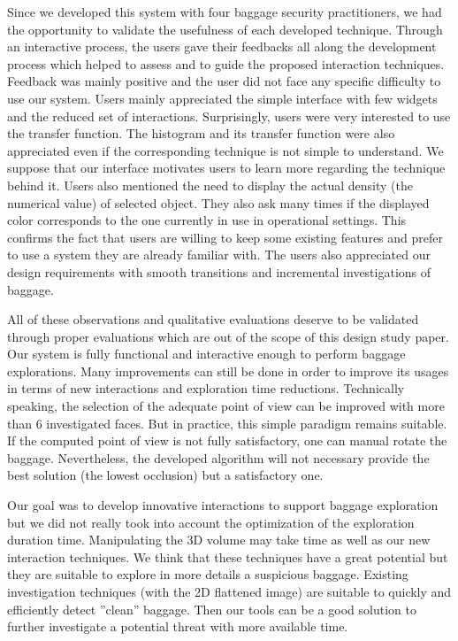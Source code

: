 Since we developed this system with four baggage security practitioners, we had the opportunity to validate the usefulness of each developed technique. Through an interactive process, the users gave their feedbacks all along the development process which helped to assess and to guide the proposed interaction techniques. Feedback was mainly positive and the user did not face any specific difficulty to use our system. Users mainly appreciated the simple interface with few widgets and the reduced set of interactions. Surprisingly, users were very interested to use the transfer function. The histogram and its transfer function were also appreciated even if the corresponding technique is not simple to understand. We suppose that our interface motivates users to learn more regarding the technique behind it. Users also mentioned the need to display the actual density (the numerical value) of selected object. They also ask many times if the displayed color corresponds to the one currently in use in operational settings. This confirms the fact that users are willing to keep some existing features and prefer to use a system they are already familiar with.
The users also appreciated our design requirements with smooth transitions and incremental investigations of baggage.
\par All of these observations and qualitative evaluations deserve to be validated through proper evaluations which are out of the scope of this design study paper.
Our system is fully functional and interactive enough to perform baggage explorations. Many improvements can still be done in order to improve its usages in terms of new interactions and exploration time reductions.
Technically speaking, the selection of the adequate point of view can be improved with more than 6 investigated faces. But in practice, this simple paradigm remains suitable. If the computed point of view is not fully satisfactory, one can manual rotate the baggage. Nevertheless, the developed algorithm will not necessary provide the best solution (the lowest occlusion) but a satisfactory one.
\par Our goal was to develop
innovative interactions to support baggage exploration but we did not really took into account the optimization of the exploration duration time. Manipulating the 3D volume may take time as well as our new interaction techniques. We think that these techniques have a great potential but they are suitable to explore in more details a suspicious baggage. Existing investigation techniques (with the 2D flattened image) are suitable to quickly and efficiently detect ''clean'' baggage. Then our tools can be a good solution to further investigate a potential threat with more available time.


